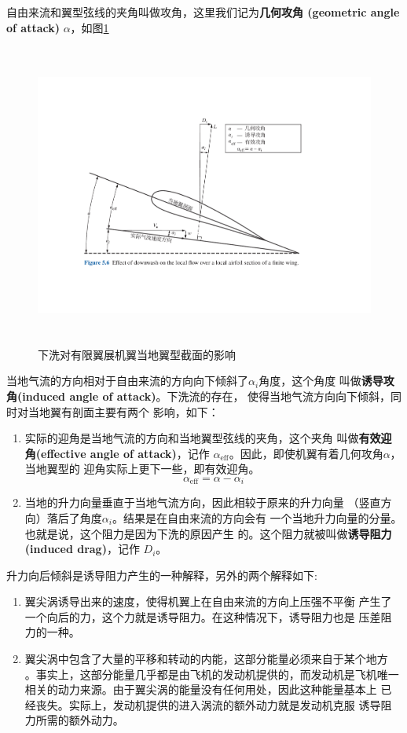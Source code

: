 自由来流和翼型弦线的夹角叫做攻角，这里我们记为{\bfseries 几何攻角
(geometric angle of attack)}
$\alpha$，如图\ref{fig:effective_attack}
\begin{figure}[!ht]
  \centering
  \includegraphics[height=10cm]{./aerodynamics/effective_attack.pdf}
  \caption{下洗对有限翼展机翼当地翼型截面的影响}
  \label{fig:effective_attack}
\end{figure}
当地气流的方向相对于自由来流的方向向下倾斜了$\alpha_i$角度，这个角度
叫做{\bfseries 诱导攻角(induced angle of attack)}。下洗流的存在，
使得当地气流方向向下倾斜，同时对当地翼有剖面主要有两个
影响，如下：
\begin{enumerate}
  \item 实际的迎角是当地气流的方向和当地翼型弦线的夹角，这个夹角
    叫做{\bfseries 有效迎角(effective angle of attack)}，记作
    $\alpha_{\mathrm{eff}}$。因此，即使机翼有着几何攻角$\alpha$，当地翼型的
    迎角实际上更下一些，即有效迎角。
    \[
      \alpha_{\mathrm{eff}}=\alpha-\alpha_i
    \]
  \item 当地的升力向量垂直于当地气流方向，因此相较于原来的升力向量
    （竖直方向）落后了角度$\alpha_i$。结果是在自由来流的方向会有
    一个当地升力向量的分量。也就是说，这个阻力是因为下洗的原因产生
    的。这个阻力就被叫做{\bfseries 诱导阻力(induced drag)}，记作
    $D_i$。
\end{enumerate}

升力向后倾斜是诱导阻力产生的一种解释，另外的两个解释如下:
\begin{enumerate}
  \item 翼尖涡诱导出来的速度，使得机翼上在自由来流的方向上压强不平衡
    产生了一个向后的力，这个力就是诱导阻力。在这种情况下，诱导阻力也是
    压差阻力的一种。
  \item 翼尖涡中包含了大量的平移和转动的内能，这部分能量必须来自于某个地方
    。事实上，这部分能量几乎都是由飞机的发动机提供的，而发动机是飞机唯一
    相关的动力来源。由于翼尖涡的能量没有任何用处，因此这种能量基本上
    已经丧失。实际上，发动机提供的进入涡流的额外动力就是发动机克服
    诱导阻力所需的额外动力。
\end{enumerate}

